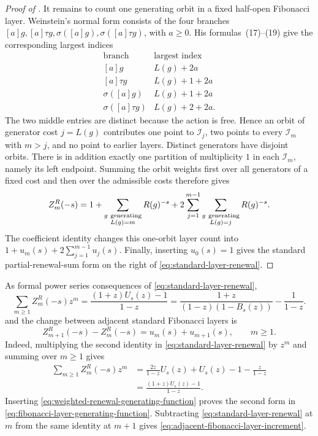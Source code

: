 \begin{proof}[Proof of ]
It remains to count one generating orbit in a fixed half-open Fibonacci
layer.  Weinstein's normal form consists of the four branches
\([a]g,[a]\tau g,\sigma([a]g),\sigma([a]\tau g)\), with \(a\ge0\).  His
formulas~(17)--(19) give the corresponding largest indices
\[
 \begin{array}{c|c}
 \text{branch}&\text{largest index}\ \\ \hline
 {}[a]g&L(g)+2a\\
 {}[a]\tau g&L(g)+1+2a\\
 \sigma({}[a]g)&L(g)+1+2a\\
 \sigma({}[a]\tau g)&L(g)+2+2a.
 \end{array}
\]
The two middle entries are distinct because the action is free.  Hence an
orbit of generator cost \(j=L(g)\) contributes one point to
\(\mathcal I_j\), two points to every \(\mathcal I_m\) with \(m>j\), and
no point to earlier layers.  Distinct generators have disjoint orbits.
There is in addition exactly one partition of multiplicity \(1\) in each
\(\mathcal I_m\), namely its left endpoint.  Summing the orbit weights
first over all generators of a fixed cost and then over the admissible costs
therefore gives
\[
 Z_m^R(-s)
 =1+\sum_{\substack{g\ {\rm generating}\\L(g)=m}}R(g)^{-s}
  +2\sum_{j=1}^{m-1}
    \sum_{\substack{g\ {\rm generating}\\L(g)=j}}R(g)^{-s}.
\]
The coefficient identity changes this one-orbit layer count into
\(1+u_m(s)+2\sum_{j=1}^{m-1}u_j(s)\).  Finally, inserting
\(u_0(s)=1\) gives the standard partial-renewal-sum form on the right of
\eqref{eq:standard-layer-renewal}.
\end{proof}

As formal power series consequences of
\eqref{eq:standard-layer-renewal},
\begin{equation}
 \sum_{m\ge1}Z_m^R(-s)z^m
 =\frac{(1+z)U_s(z)-1}{1-z}
 =\frac{1+z}{(1-z)(1-B_s(z))}-\frac1{1-z}.
 \label{eq:fibonacci-layer-generating-function}
\end{equation}
and the change between adjacent standard Fibonacci layers is
\begin{equation}
 Z_{m+1}^R(-s)-Z_m^R(-s)=u_m(s)+u_{m+1}(s),
 \qquad m\ge1.
 \label{eq:adjacent-fibonacci-layer-increment}
\end{equation}
Indeed, multiplying the second identity in
\eqref{eq:standard-layer-renewal} by \(z^m\) and summing over \(m\ge1\)
gives
\begin{align*}
 \sum_{m\ge1}Z_m^R(-s)z^m
 &=\frac{2z}{1-z}U_s(z)+U_s(z)-1-\frac z{1-z}\\
 &=\frac{(1+z)U_s(z)-1}{1-z}.
\end{align*}
Inserting \eqref{eq:weighted-renewal-generating-function} proves the second
form in \eqref{eq:fibonacci-layer-generating-function}.  Subtracting
\eqref{eq:standard-layer-renewal} at \(m\) from the same identity at
\(m+1\) gives \eqref{eq:adjacent-fibonacci-layer-increment}.

